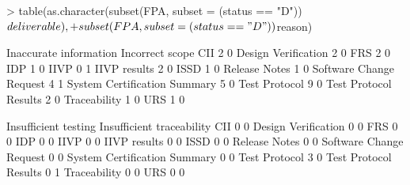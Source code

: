 \documentclass{article}
\begin{document}
\begin{Schunk}
\begin{Sinput}
> table(as.character(subset(FPA, subset = (status == "D"))$deliverable),
+       subset(FPA, subset = (status == "D"))$reason)
\end{Sinput}
\begin{Soutput}
                               Inaccurate information Incorrect scope
  CII                                               2               0
  Design Verification                               2               0
  FRS                                               2               0
  IDP                                               1               0
  IIVP                                              0               1
  IIVP results                                      2               0
  ISSD                                              1               0
  Release Notes                                     1               0
  Software Change Request                           4               1
  System Certification Summary                      5               0
  Test Protocol                                     9               0
  Test Protocol Results                             2               0
  Traceability                                      1               0
  URS                                               1               0
                              
                               Insufficient testing Insufficient traceability
  CII                                             0                         0
  Design Verification                             0                         0
  FRS                                             0                         0
  IDP                                             0                         0
  IIVP                                            0                         0
  IIVP results                                    0                         0
  ISSD                                            0                         0
  Release Notes                                   0                         0
  Software Change Request                         0                         0
  System Certification Summary                    0                         0
  Test Protocol                                   3                         0
  Test Protocol Results                           0                         1
  Traceability                                    0                         0
  URS                                             0                         0
                              

\end{Soutput}
\end{Schunk}
\end{document}
